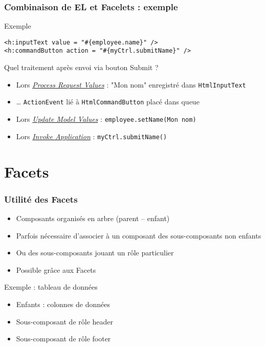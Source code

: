 \documentclass[english, french]{beamer}
\begin{document}
\begin{frame}[fragile]
	\frametitle{Combinaison de EL et Facelets : exemple}
	\begin{exampleblock}{Exemple}
	\begin{lstlisting}[aboveskip=0em, belowskip=0em]
<h:inputText value = "#{employee.name}" />
<h:commandButton action = "#{myCtrl.submitName}" />
	\end{lstlisting}
	\end{exampleblock}
	Quel traitement après envoi via bouton Submit ?
	\pause
	\begin{itemize}
		\item Lors \hyperlink{ph-prv}{\emph{Process Request Values}} : "Mon nom" enregistré dans \texttt{HtmlInputText} \pause
		\item … \texttt{ActionEvent} lié à \texttt{HtmlCommandButton} placé dans queue \pause
		\item Lors \hyperlink{ph-umv}{\emph{Update Model Values}} : \texttt{employee.setName(Mon nom)} \pause
		\item Lors \hyperlink{ph-ia}{\emph{Invoke Application}} : \texttt{myCtrl.submitName()}
	\end{itemize}
\end{frame}

\section{Facets}
\begin{frame}
	\frametitle{Utilité des Facets}
	\begin{itemize}
		\item Composants organisés en arbre (parent – enfant)
		\item Parfois nécessaire d’associer à un composant des sous-composants non enfants
		\item Ou des sous-composants jouant un rôle particulier
		\item Possible grâce aux \og{}Facets\fg{}
	\end{itemize}
	\begin{exampleblock}{Exemple : tableau de données}
		\begin{itemize}
			\item Enfants : colonnes de données
			\item Sous-composant de rôle \og{}header\fg{}
			\item Sous-composant de rôle \og{}footer\fg{}
		\end{itemize}		
	\end{exampleblock}
\end{frame}
\end{document}
